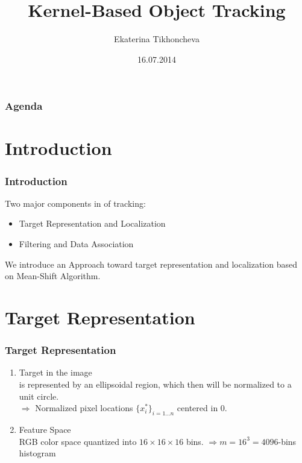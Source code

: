 \documentclass[hyperref={pdfpagelabels=false}]{beamer}
\title{Kernel-Based Object Tracking}
\author{Ekaterina Tikhoncheva}
\date{16.07.2014}
\newcounter{saveenumi}
\newcommand{\seti}{\setcounter{saveenumi}{\value{enumi}}}
\begin{document}
\begin{frame}
\titlepage
\end{frame}

\begin{frame}
\frametitle{Agenda}
\tableofcontents
\end{frame} 


\section{Introduction}
\begin{frame}
\frametitle{Introduction}
Two major components in of tracking:
\begin{itemize}
\item Target Representation and Localization
\item Filtering and Data Association
\end{itemize}

We introduce an Approach toward target representation and localization based on 
{\color{darkred} Mean-Shift Algorithm}\cite{KernelBasedObjectTracking}.

\end{frame}


\section{Target Representation}
\begin{frame}
\frametitle{Target Representation}
\begin{enumerate}
\item Target in the image \\
	is represented by an {\color{darkred} ellipsoidal region}, which then
	will be normalized to a {\color{darkred} unit circle}.
	\\ $\Rightarrow$ Normalized pixel locations $\{x^{*}_i\}_{i=1\dots n}$ centered in $0$.
\item Feature Space \\
	{\color{darkred} RGB color space} quantized into $16\times 16\times 16$ bins.
	$\Rightarrow m= 16^3 = 4096$-bins histogram
\end{enumerate}

\seti
\end{frame}
\end{document}
